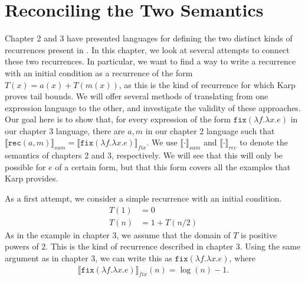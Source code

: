 \chapter{Reconciling the Two Semantics}
Chapter 2 and 3 have presented languages for defining the two distinct kinds of recurrences present in \cite{Karp}. 
In this chapter, we look at several attempts to connect these two recurrences. In particular, we want to find a way 
to write a recurrence with an initial condition as a recurrence of the form $T(x) = a(x) + T(m(x))$, as this is the kind
of recurrence for which Karp proves tail bounds. We will offer
several methods of translating from one expression language to the other, and investigate the validity of these 
approaches. Our goal here is to show that, for every expression of the form $\texttt{fix}(\lambda f.\lambda x.e)$ in our
 chapter 3 language, there are $a, m$ in our chapter 2 language such that 
 $\llbracket \texttt{rec}(a,m)\rrbracket_{sum} = \llbracket \texttt{fix}(\lambda f.\lambda x.e)\rrbracket_{fix}$. We use
 $\llbracket \cdot\rrbracket_{sum}$ and $\llbracket \cdot\rrbracket_{rec}$ to denote the semantics of chapters 2 and
 3, respectively. We will see that this will only be possible for $e$ of a certain form, but that this form covers all the 
 examples that Karp provides.

As a first attempt, we consider a simple recurrence with an initial condition.
\begin{align*}
T(1) &= 0 \\
T(n) &= 1 + T(n/2 ) 
\end{align*}
As in the example in chapter 3, we assume that the domain of $T$ is positive powers of $2$.
This is the kind of recurrence described in chapter 3. Using the same argument as in chapter 3,
we can write this as $\texttt{fix}(\lambda f.\lambda x.e)$, where 
\begin{align*}
\llbracket \texttt{fix}(\lambda f.\lambda x.e)\rrbracket_{fix}(n) = \log(n) - 1.
\end{align*} 

